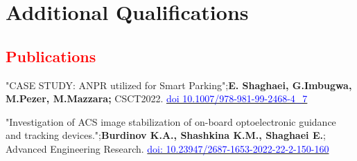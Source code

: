 \section{Additional Qualifications}

\renewcommand{\labelitemi}{o}

\subsection{\textbf{\textcolor{red}{Publications}}}
	
    {"CASE STUDY: ANPR utilized for Smart Parking";\textbf{E. Shaghaei, G.Imbugwa, M.Pezer, M.Mazzara;} CSCT2022. \href{https://doi.org/10.1007/978-981-99-2468-4_7}{\textcolor{blue}{doi 10.1007/978-981-99-2468-4\_7}}}
    
    
    {"Investigation of ACS image stabilization of on-board optoelectronic guidance and tracking devices.";\textbf{Burdinov K.A., Shashkina K.M., Shaghaei E.};   Advanced Engineering Research. \href{https://doi.org/10.23947/2687-1653-2022-22-2-150-160}{\textcolor{blue}{doi: 10.23947/2687-1653-2022-22-2-150-160}}}
    

	

